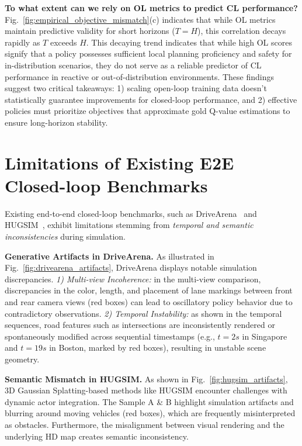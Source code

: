 \documentclass{article}
\begin{document}
\textbf{To what extent can we rely on OL metrics to predict CL performance?} Fig.~\ref{fig:empirical_objective_mismatch}(c) indicates that while OL metrics maintain predictive validity for short horizons ($T=H$), this correlation decays rapidly as $T$ exceeds $H$. This decaying trend indicates that while high OL scores signify that a policy possesses sufficient local planning proficiency and safety for in-distribution scenarios, they do not serve as a reliable predictor of CL performance in reactive or out-of-distribution environments. These findings suggest two critical takeaways: 1) scaling open-loop training data doesn't statistically guarantee improvements for closed-loop performance, and 2) effective policies must prioritize objectives that approximate gold Q-value estimations to ensure long-horizon stability. 

\section{Limitations of Existing E2E Closed-loop Benchmarks}
\label{appendix:current_e2e_bottlenecks}

Existing end-to-end closed-loop benchmarks, such as DriveArena~\cite{yang2024drivearena} and HUGSIM~\cite{zhou2024hugsim}, exhibit limitations stemming from \textit{temporal and semantic inconsistencies} during simulation.

\textbf{Generative Artifacts in DriveArena.} 
As illustrated in Fig.~\ref{fig:drivearena_artifacts}, DriveArena displays notable simulation discrepancies. \textit{1) Multi-view Incoherence:} in the multi-view comparison, discrepancies in the color, length, and placement of lane markings between front and rear camera views (red boxes) can lead to oscillatory policy behavior due to contradictory observations. \textit{2) Temporal Instability:} as shown in the temporal sequences, road features such as intersections are inconsistently rendered or spontaneously modified across sequential timestamps (e.g., $t=2s$ in Singapore and $t=19s$ in Boston, marked by red boxes), resulting in unstable scene geometry.

\textbf{Semantic Mismatch in HUGSIM.} 
As shown in Fig.~\ref{fig:hugsim_artifacts}, 3D Gaussian Splatting-based methods like HUGSIM encounter challenges with dynamic actor integration. The Sample A \& B highlight simulation artifacts and blurring around moving vehicles (red boxes), which are frequently misinterpreted as obstacles. Furthermore, the misalignment between visual rendering and the underlying HD map creates semantic inconsistency.
\end{document}
